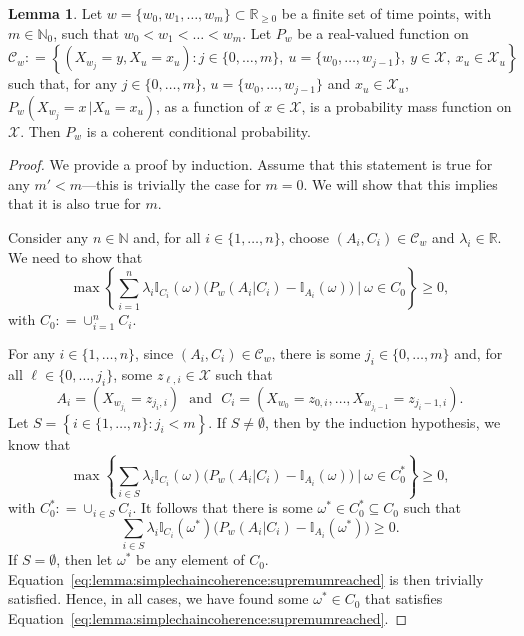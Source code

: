 \documentclass[10pt,a4paper]{paper}
\theoremstyle{definition}
\newtheorem{lemma}[theorem]{Lemma}
\newcommand{\nats}{\mathbb{N}}
\newcommand{\reals}{\mathbb{R}}
\newcommand{\states}{\mathcal{X}}
\newcommand{\ind}[1]{\mathbb{I}_{#1}}
\newcommand{\coloneqq}{:\!=}
\begin{document}
\begin{lemma}\label{lemma:simplechaincoherence}
Let $w=\{w_0,w_1,\dots,w_m\}\subset\reals_{\geq0}$ be a finite set of time points, with $m\in\nats_0$, such that $w_0<w_1<\dots<w_m$.
Let $P_w$ be a real-valued function on
\begin{equation*}
\mathcal{C}_w\coloneqq
\left\{
(X_{w_j}=y,X_u=x_u)
\colon 
j\in\{0,\dots,m\},~
u=\{w_0,\dots,w_{j-1}\},~
y\in\states,~
x_u\in\states_u
\right\}
\end{equation*}
such that, for any $j\in\{0,\dots,m\}$, $u=\{w_0,\dots,w_{j-1}\}$ and $x_u\in\states_u$, $P_w(X_{w_j}=x\,\vert X_u=x_u)$, as a function of $x\in\states$, is a probability mass function on $\states$. Then $P_w$ is a coherent conditional probability.
\end{lemma}
\begin{proof}
We provide a proof by induction. Assume that this statement is true for any $m'<m$---this is trivially the case for $m=0$. We will show that this implies that it is also true for $m$.

Consider any $n\in\nats$ and, for all $i\in\{1,\dots,n\}$, choose $(A_i,C_i)\in\mathcal{C}_w$ and $\lambda_i\in\reals$. We need to show that
\begin{equation}\label{eq:lemma:simplechaincoherence:TB}
\max\left\{\sum_{i=1}^n\lambda_i\ind{C_i}(\omega)\bigl(P_w(A_i\vert C_i)-\ind{A_i}(\omega)\bigr)~\Bigg\vert~\omega\in C_0\right\}\geq0,
\end{equation}
with $C_0\coloneqq\cup_{i=1}^nC_i$. 

For any $i\in\{1,\dots,n\}$, since $(A_i,C_i)\in\mathcal{C}_w$, there is some $j_i\in\{0,\dots,m\}$ and, for all $\ell\in\{0,\dots,j_i\}$, some $z_{\ell,i}\in\states$ such that
\begin{equation*}
A_i=(X_{w_{j_i}}=z_{j_i,i})
\text{~~and~~}
C_i=(X_{w_{0}}=z_{0,i}, \dots, X_{w_{j_i-1}}=z_{j_i-1,i}).
\end{equation*}
Let $S=\left\{i\in\{1,\dots,n\}\colon j_i<m\right\}$. If $S\neq\emptyset$, then by the induction hypothesis, we know that
\begin{equation*}
\max\left\{\sum_{i\in S}\lambda_i\ind{C_i}(\omega)\bigl(P_w(A_i\vert C_i)-\ind{A_i}(\omega)\bigr)~\Bigg\vert~\omega\in C_0^*\right\}\geq0,
\end{equation*}
with $C_0^*\coloneqq\cup_{i\in S}C_i$. It follows that there is some $\omega^*\in C_0^*\subseteq C_0$ such that
\begin{equation}\label{eq:lemma:simplechaincoherence:supremumreached}
\sum_{i\in S}\lambda_i\ind{C_i}(\omega^*)\bigl(P_w(A_i\vert C_i)-\ind{A_i}(\omega^*)\bigr)\geq0.
\end{equation}
If $S=\emptyset$, then let $\omega^*$ be any element of $C_0$. Equation~\eqref{eq:lemma:simplechaincoherence:supremumreached} is then trivially satisfied. Hence, in all cases, we have found some $\omega^*\in C_0$ that satisfies Equation~\eqref{eq:lemma:simplechaincoherence:supremumreached}.



\end{proof}
\end{document}
